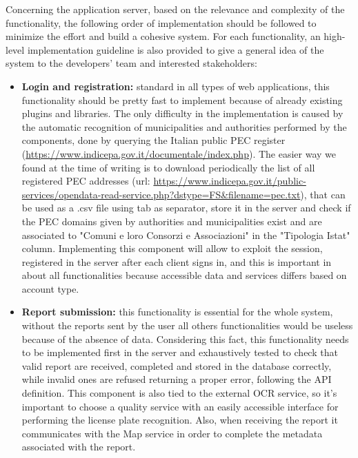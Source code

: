 Concerning the application server, based on the relevance and complexity of the functionality, the following order of implementation should be followed to minimize the effort and build a cohesive system. For each functionality, an high-level implementation guideline is also provided to give a general idea of the system to the developers' team and interested stakeholders:
\begin{itemize}
	\item \textbf{Login and registration:} standard in all types of web applications, this functionality should be pretty fast to implement because of already existing plugins and libraries. The only difficulty in the implementation is caused by the automatic recognition of municipalities and authorities performed by the components, done by querying the Italian public PEC register (\url{https://www.indicepa.gov.it/documentale/index.php}). The easier way we found at the time of writing is to download periodically the list of all registered PEC addresses (url: \url{https://www.indicepa.gov.it/public-services/opendata-read-service.php?dstype=FS&filename=pec.txt}), that can be used as a .csv file using tab as separator, store it in the server and check if the PEC domains given by authorities and municipalities exist and are associated to "Comuni e loro Consorzi e Associazioni" in the "Tipologia Istat" column. Implementing this component will allow to exploit the session, registered in the server after each client signs in, and this is important in about all functionalities because accessible data and services differs based on account type.
	\item \textbf{Report submission:} this functionality is essential for the whole system, without the reports sent by the user all others functionalities would be useless because of the absence of data. Considering this fact, this functionality needs to be implemented first in the server and exhaustively tested to check that valid report are received, completed and stored in the database correctly, while invalid ones are refused returning a proper error, following the API definition. This component is also tied to the external OCR service, so it's important to choose a quality service with an easily accessible interface for performing the license plate recognition. Also, when receiving the report it communicates with the Map service in order to complete the metadata associated with the report.

\end{itemize}
